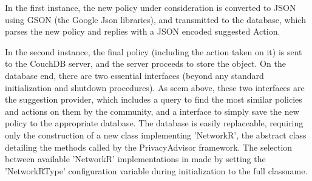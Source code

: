 In the first instance, the new policy under consideration is converted to JSON using GSON (the Google Json libraries), and transmitted to the database, which parses the new policy and replies with a JSON encoded suggested Action.

In the second instance, the final policy (including the action taken on it) is sent to the CouchDB server, and the server proceeds to store the object.
On the database end, there are two essential interfaces (beyond any standard initialization and shutdown procedures). As seem above, these two interfaces are the suggestion provider, which includes a query to find the most similar policies and actions on them by the community, and a interface to simply save the new policy to the appropriate database.
The database is easily replaceable, requiring only the construction of a new class implementing 'NetworkR', the abstract class detailing the methods called by the PrivacyAdvisor framework. The selection between available 'NetworkR' implementations in made by setting the 'NetworkRType' configuration variable during initialization to the full classname.
